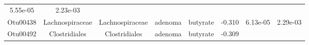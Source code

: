 \documentclass[11pt,]{article}
\begin{document}
\begin{longtable}[]{@{}cccccccc@{}}
\begin{minipage}[t]{0.08\columnwidth}
5.55e-05\strut
\end{minipage} & \begin{minipage}[t]{0.08\columnwidth}\centering\strut
2.23e-03\strut
\end{minipage}\tabularnewline
\begin{minipage}[t]{0.08\columnwidth}\centering\strut
Otu00438\strut
\end{minipage} & \begin{minipage}[t]{0.15\columnwidth}\centering\strut
Lachnospiraceae\strut
\end{minipage} & \begin{minipage}[t]{0.15\columnwidth}\centering\strut
Lachnospiraceae\strut
\end{minipage} & \begin{minipage}[t]{0.08\columnwidth}\centering\strut
adenoma\strut
\end{minipage} & \begin{minipage}[t]{0.09\columnwidth}\centering\strut
butyrate\strut
\end{minipage} & \begin{minipage}[t]{0.07\columnwidth}\centering\strut
-0.310\strut
\end{minipage} & \begin{minipage}[t]{0.08\columnwidth}\centering\strut
6.13e-05\strut
\end{minipage} & \begin{minipage}[t]{0.08\columnwidth}\centering\strut
2.29e-03\strut
\end{minipage}\tabularnewline
\begin{minipage}[t]{0.08\columnwidth}\centering\strut
Otu00492\strut
\end{minipage} & \begin{minipage}[t]{0.15\columnwidth}\centering\strut
Clostridiales\strut
\end{minipage} & \begin{minipage}[t]{0.15\columnwidth}\centering\strut
Clostridiales\strut
\end{minipage} & \begin{minipage}[t]{0.08\columnwidth}\centering\strut
adenoma\strut
\end{minipage} & \begin{minipage}[t]{0.09\columnwidth}\centering\strut
butyrate\strut
\end{minipage} & \begin{minipage}[t]{0.07\columnwidth}\centering\strut
-0.309\strut
\end{minipage} & \begin{minipage}[t]{0.08\columnwidth}\centering\strut

\end{minipage}
\end{longtable}
\end{document}
